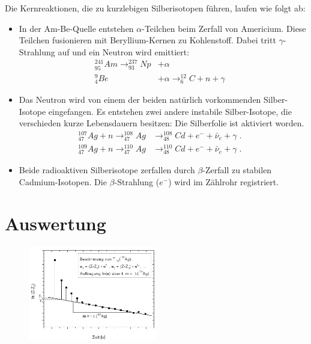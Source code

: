 \begin{hint}
Die Kernreaktionen, die zu kurzlebigen Silberisotopen führen, laufen wie folgt ab:
\begin{itemize}
	\item In der Am-Be-Quelle entstehen $\alpha$-Teilchen beim Zerfall von Americium. Diese Teilchen fusionieren mit Beryllium-Kernen zu Kohlenstoff. Dabei tritt $\gamma$-Strahlung auf und ein Neutron wird emittiert:
		\begin{align*}
			^{241}_{95}Am \rightarrow ^{237}_{93}Np & + \alpha &\\
			^9_4 Be & + \alpha \rightarrow ^{12}_6C + n + \gamma
		\end{align*}
	\item Das Neutron wird von einem der beiden natürlich vorkommenden Silber-Isotope eingefangen. Es entstehen zwei andere instabile Silber-Isotope, die verschieden kurze Lebensdauern besitzen: Die Silberfolie ist aktiviert worden.
		\begin{align*}
			^{107}_{47}Ag + n \rightarrow ^{108}_{47}Ag & \rightarrow ^{108}_{48}Cd + e^- + \bar{\nu}_e + \gamma \; . &\\
			^{109}_{47}Ag + n \rightarrow ^{110}_{47}Ag & \rightarrow ^{110}_{48}Cd + e^- + \bar{\nu}_e + \gamma \; .
		\end{align*}
	\item Beide radioaktiven Silberisotope zerfallen durch $\beta$-Zerfall zu stabilen Cadmium-Isotopen. Die $\beta$-Strahlung ($e^-$) wird im Zählrohr registriert.
\end{itemize}
\end{hint}

\section{Auswertung} 
\begin{figure}[h]
	\centering
		\includegraphics[width=0.5\textwidth]{Abbildungen/Bestimmung_Halbwertszeiten.jpg}
	\label{fig:Bestimmung_Halbwertszeiten}
\end{figure}

